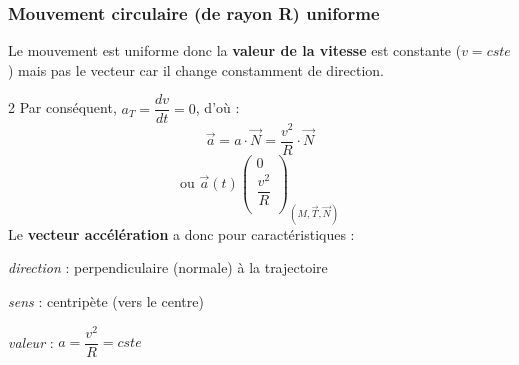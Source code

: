 \documentclass[a4paper,11pt,fleqn]{article}%
\begin{document}
		\subsubsection*{Mouvement circulaire (de rayon R) uniforme}
		Le mouvement est uniforme donc la \textbf{valeur de la vitesse} est constante ($v = cste$) mais pas le vecteur car il change constamment de direction.
\begin{multicols}{2}
		Par conséquent, $a_T = \dfrac{dv}{dt} =0$, d'où :
		$$\vec{a}=a \cdot \vec{N} = \dfrac{v^2}{R} \cdot \vec{N}$$
		$$\text{ou } \vec{a}(t) \left(
			\begin{array}{c}
			0\\
			\dfrac{v^2}{R}\\			
			\end{array}
			\right)_{(M,\vec{T},\vec{N})}$$
		Le \textbf{vecteur accélération} a donc pour caractéristiques : 
		\begin{itemize*}
			\item \textit{direction} : perpendiculaire (normale) à la trajectoire
			\item \textit{sens} : centripète (vers le centre)
			\item \textit{valeur} : $a=\dfrac{v^2}{R}=cste$
		\end{itemize*}

\noindent
{}

\end{multicols}
		
\end{document}
